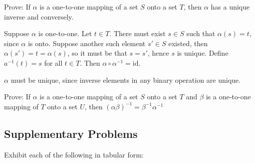 \exercise
Prove: If $\alpha$ is a one-to-one mapping of a set $S$ onto a set $T$, then $\alpha$ has a unique inverse and conversely.

\answer
Suppose $\alpha$ is one-to-one. Let $t \in T$. There must exist $s \in S$ such that $\alpha(s) = t$, since $\alpha$ is onto. Suppose another such element $s' \in S$ existed, then $\alpha(s') = t = \alpha(s)$, so it must be that $s = s'$, hence $s$ is unique. Define $a^{-1}(t) = s$ for all $t \in T$. Then $\alpha \circ \alpha^{-1} = \text{id}$. 

$\alpha$ must be unique, since inverse elements in any binary operation are unique.


\exercise 
Prove: If $\alpha$ is a one-to-one mapping of a set $S$ onto a set $T$ and $\beta$ is a one-to-one mapping of $T$ onto a set $U$, then $(\alpha\beta)^{-1} = \beta^{-1} \alpha^{-1}$

\answer


\subsection*{Supplementary Problems}

\exercise
Exhibit each of the following in tabular form:

\answer
